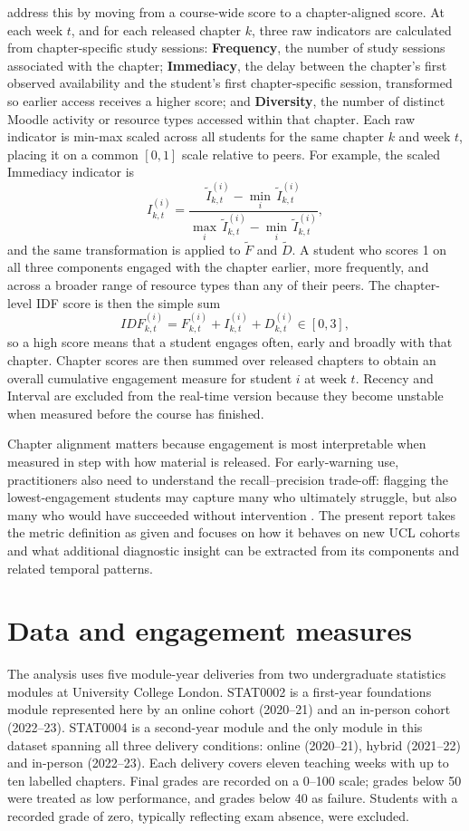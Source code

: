 \documentclass[11pt,a4paper]{article}
\begin{document}
\citet{johnston2025} address this by moving from a course-wide score to a
chapter-aligned score. At each week $t$, and for each released chapter $k$, three
raw indicators are calculated from chapter-specific study sessions:
\textbf{Frequency}, the number of study sessions associated with the chapter;
\textbf{Immediacy}, the delay between the chapter's first observed availability
and the student's first chapter-specific session, transformed so earlier access
receives a higher score; and \textbf{Diversity}, the number of distinct Moodle
activity or resource types accessed within that chapter. Each raw indicator is min-max scaled across all students for the same chapter
$k$ and week $t$, placing it on a common $[0,1]$ scale relative to peers. For
example, the scaled Immediacy indicator is
\[
  I_{k,t}^{(i)} =
  \frac{\tilde{I}_{k,t}^{(i)} - \min_{i}\,\tilde{I}_{k,t}^{(i)}}
       {\max_{i}\,\tilde{I}_{k,t}^{(i)} - \min_{i}\,\tilde{I}_{k,t}^{(i)}},
\]
and the same transformation is applied to $\tilde{F}$ and $\tilde{D}$. A student
who scores 1 on all three components engaged with the chapter earlier, more
frequently, and across a broader range of resource types than any of their peers.
The chapter-level IDF score is then the simple sum
\[
IDF_{k,t}^{(i)} = F_{k,t}^{(i)} + I_{k,t}^{(i)} + D_{k,t}^{(i)} \in [0,3],
\]
so a high score means that a student engages often, early and broadly with that
chapter. Chapter scores are then summed over released chapters to obtain an
overall cumulative engagement measure for student $i$ at week $t$. Recency and
Interval are excluded from the real-time version because they become unstable
when measured before the course has finished.

Chapter alignment matters because engagement is most interpretable when measured
in step with how material is released. For early-warning use, practitioners also
need to understand the recall--precision trade-off: flagging the lowest-engagement
students may capture many who ultimately struggle, but also many who would have
succeeded without intervention \citep{conijn2017}. The present report takes the
metric definition as given and focuses on how it behaves on new UCL cohorts and
what additional diagnostic insight can be extracted from its components and
related temporal patterns.

\section{Data and engagement measures}
The analysis uses five module-year deliveries from two undergraduate statistics
modules at University College London. STAT0002 is a first-year foundations module
represented here by an online cohort (2020--21) and an in-person cohort
(2022--23). STAT0004 is a second-year module and the only module in this dataset
spanning all three delivery conditions: online (2020--21), hybrid (2021--22) and
in-person (2022--23). Each delivery covers eleven teaching weeks with up to ten
labelled chapters. Final grades are recorded on a 0--100 scale; grades below 50
were treated as low performance, and grades below 40 as failure. Students with
a recorded grade of zero, typically reflecting exam absence, were excluded.
\end{document}
